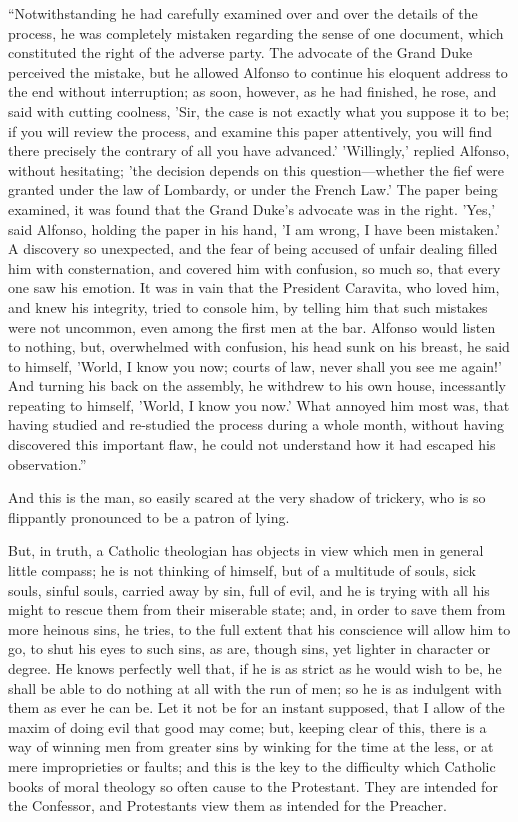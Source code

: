 ``Notwithstanding he had carefully examined over and over the
details of the process, he was completely mistaken regarding the sense
of one document, which constituted the right of the adverse party. The
advocate of the Grand Duke perceived the mistake, but he allowed Alfonso
to continue his eloquent address to the end without interruption;
as soon, however, as he had finished, he rose, and said with cutting
coolness, 'Sir, the case is not exactly what you suppose it to be; if
you will review the process, and examine this paper attentively, you
will find there precisely the contrary of all you have advanced.'
'Willingly,' replied Alfonso, without hesitating; 'the decision depends
on this question—whether the fief were granted under the law of
Lombardy, or under the French Law.' The paper being examined, it was
found that the Grand Duke's advocate was in the right. 'Yes,' said
Alfonso, holding the paper in his hand, 'I am wrong, I have been
mistaken.' A discovery so unexpected, and the fear of being accused of
unfair dealing filled him with consternation, and covered him with
confusion, so much so, that every one saw his emotion. It was in vain
that the President Caravita, who loved him, and knew his integrity,
tried to console him, by telling him that such mistakes were not
uncommon, even among the first men at the bar. Alfonso would listen to
nothing, but, overwhelmed with confusion, his head sunk on his breast,
he said to himself, 'World, I know you now; courts of law, never shall
you see me again!' And turning his back on the assembly, he withdrew to
his own house, incessantly repeating to himself, 'World, I know you
now.' What annoyed him most was, that having studied and re-studied the
process during a whole month, without having discovered this important
flaw, he could not understand how it had escaped his observation.''

And this is the man, so easily scared at the very shadow of
trickery, who is so flippantly pronounced to be a patron of lying.

But, in truth, a Catholic theologian has objects in view which men in
general little compass; he is not thinking of himself, but of a
multitude of souls, sick souls, sinful souls, carried away by sin, full
of evil, and he is trying with all his might to rescue them from their
miserable state; and, in order to save them from more heinous sins, he
tries, to the full extent that his conscience will allow him to go, to
shut his eyes to such sins, as are, though sins, yet lighter in
character or degree. He knows perfectly well that, if he is as
strict as he would wish to be, he shall be able to do nothing at all
with the run of men; so he is as indulgent with them as ever he can be.
Let it not be for an instant supposed, that I allow of the maxim of
doing evil that good may come; but, keeping clear of this, there is a
way of winning men from greater sins by winking for the time at the
less, or at mere improprieties or faults; and this is the key to the
difficulty which Catholic books of moral theology so often cause to the
Protestant. They are intended for the Confessor, and Protestants view
them as intended for the Preacher.

